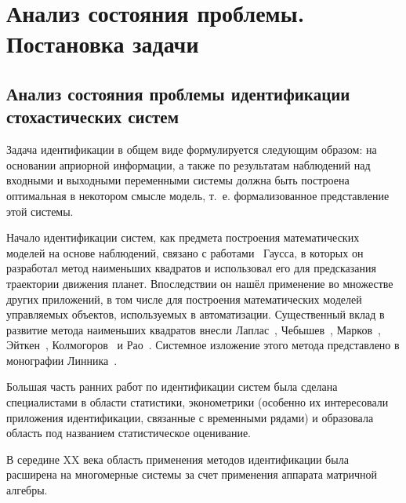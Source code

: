 \chapter[Анализ состояния проблемы. Постановка задачи]{%
  Анализ состояния проблемы. \hspace{2cm}
  Постановка задачи
}

\section[Анализ состояния проблемы идентификации стохастических систем]{%
  Анализ состояния проблемы идентификации \\
  стохастических систем
}

Задача идентификации в общем виде формулируется следующим образом:
на основании априорной информации, а также по результатам наблюдений над
входными и выходными переменными системы должна быть построена оптимальная в
некотором смысле модель, т.~е. формализованное представление этой системы.

Начало идентификации систем, как предмета построения математических моделей на основе наблюдений,
связано с работами~\cite{gauss_1809, gauss_1810, gauss_1821} Гаусса,
в которых он разработал метод наименьших квадратов и использовал его для предсказания
траектории движения планет.
Впоследствии он нашёл применение во множестве других приложений,
в том числе для построения математических моделей управляемых объектов,
используемых в автоматизации.
Существенный вклад в развитие метода наименьших квадратов внесли
Лаплас~\cite{laplace_1812}, Чебышев~\cite{chebyshev_1859}, Марков~\cite{markov_1898},
Эйткен~\cite{aitken_1935}, Колмогоров~\cite{kolmogorov_1946} и Рао~\cite{rao_1946}.
Системное изложение этого метода представлено в монографии Линника~\cite{linnik62}.

Большая часть ранних работ по идентификации систем была сделана специалистами в области статистики,
эконометрики (особенно их интересовали приложения идентификации, связанные с временными рядами) и
образовала область под названием статистическое оценивание.

В середине XX века область применения методов идентификации была расширена на
многомерные системы за счет применения аппарата матричной алгебры.


